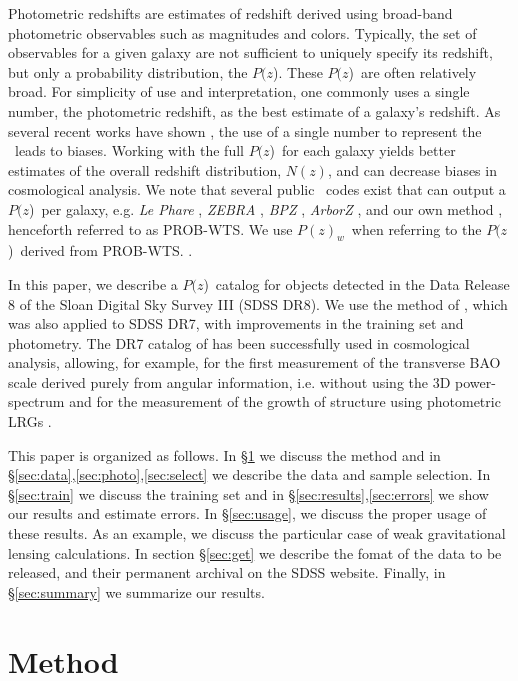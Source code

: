 \documentclass[preprint]{aastex}
\newcommand{\pofz}{$P(z$)}
\newcommand{\pofzw}{$P(z)_w$\ }
\begin{document}
Photometric redshifts are estimates of redshift derived using broad-band
photometric observables such as magnitudes and colors.  Typically, the set of
observables for a given galaxy are not sufficient to uniquely specify its
redshift, but only a probability distribution, the \pofz.  These \pofz\ are
often relatively broad. For simplicity of use and interpretation, one commonly
uses a single number, the photometric redshift, as the best estimate of a
galaxy's redshift.  As several recent works have shown
\citep{man08,CunhaPhotoz09,wit09,bor10,abr11}, the use of a single number to
represent the \photoz\ leads to biases.  Working with the full \pofz\ for each
galaxy yields better estimates of the overall redshift distribution, $N(z)$,
and can decrease biases in cosmological analysis.  We note that several public
\photoz\ codes exist that can output a \pofz\ per galaxy, e.g.  {\it Le Phare}
\citep{arn99,ilb06}, {\it ZEBRA} \citep{fel06}, {\it BPZ} \citep{coe06}, {\it
ArborZ} \citep{ger10}, and our own method \citep{CunhaPhotoz09}, henceforth 
referred to as PROB-WTS.
We use \pofzw when referring to the \pofz\  derived from PROB-WTS.  .


In this paper, we describe a \pofz\ catalog for objects detected in the Data
Release 8 of the Sloan Digital Sky Survey III (SDSS DR8).  We use the method of
\citet{CunhaPhotoz09}, which was also applied to SDSS DR7, with improvements in
the training set and photometry.  The DR7 catalog of \cite{CunhaPhotoz09} has
been successfully used in cosmological analysis, allowing, for example, for the
first measurement of the transverse BAO scale derived purely from angular
information, i.e. without using the 3D power-spectrum \citep{car11}  and for
the measurement of the growth of structure using photometric LRGs
\citep{cro11}. 

This paper is organized as follows.  In \S \ref{sec:method} we discuss the
method and in \S \ref{sec:data},\ref{sec:photo},\ref{sec:select} we describe
the data and sample selection. In \S \ref{sec:train} we discuss the training
set and in \S \ref{sec:results},\ref{sec:errors} we show our results and
estimate errors.  In \S \ref{sec:usage}, we discuss the proper usage of these
results. As an example, we discuss the particular case of weak gravitational
lensing calculations.  In section \S \ref{sec:get} we describe the fomat of the
data to be released, and their permanent archival on the SDSS website.
Finally, in \S \ref{sec:summary} we summarize our results.

\section{Method} \label{sec:method}
\end{document}
